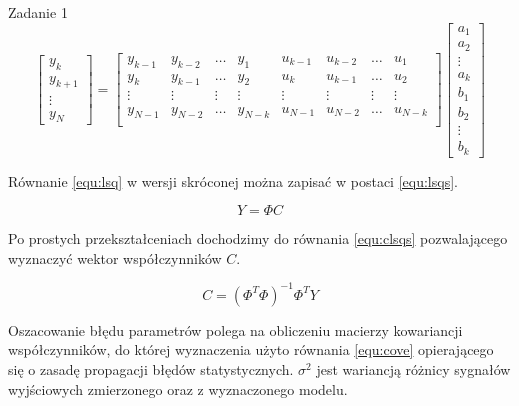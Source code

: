 \documentclass[12pt]{article}
\begin{document}
\begin{section}{Zadanie 1}
    \begin{equation}
      \begin{bmatrix}
        y_k \\ y_{k+1} \\ \vdots \\ y_N
      \end{bmatrix} =
      \begin{bmatrix}
        y_{k-1} & y_{k-2} & \hdots & y_{1} & u_{k-1} & u_{k-2} & \hdots & u_1 \\
        y_{k}   & y_{k-1} & \hdots & y_{2} & u_{k}   & u_{k-1} & \hdots & u_2 \\
        \vdots  & \vdots  & \vdots & \vdots & \vdots & \vdots  &\vdots  & \vdots \\
        y_{N-1} & y_{N-2} & \hdots & y_{N-k} & u_{N-1} & u_{N-2} & \hdots &
        u_{N-k} \\
      \end{bmatrix}
      \begin{bmatrix}
        a_1 \\ a_2 \\ \vdots \\ a_k \\ b_1 \\ b_2 \\ \vdots \\ b_k 
      \end{bmatrix}
      \label{equ:lsq}
    \end{equation}
    \vspace{0.2cm}
    
    \newpage
    
    Równanie \ref{equ:lsq} w wersji skróconej można zapisać w postaci
    \ref{equ:lsqs}.
    
    \begin{equation}
      Y = \Phi C
      \label{equ:lsqs} 
    \end{equation}
    \vspace{0.2cm}
    
    Po prostych przekształceniach dochodzimy do równania \ref{equ:clsqs} pozwalającego
    wyznaczyć wektor współczynników $C$.
    
    \begin{equation}
      C = (\Phi^T\Phi)^{-1}\Phi^T Y
      \label{equ:clsqs} 
    \end{equation}
    \vspace{0.2cm}
    
    Oszacowanie błędu parametrów polega na obliczeniu macierzy kowariancji
    współczynników, do której wyznaczenia użyto równania \ref{equ:cove}
    opierającego się o zasadę propagacji błędów statystycznych.
    $\sigma^2$ jest wariancją różnicy sygnałów wyjściowych zmierzonego oraz z
    wyznaczonego modelu.
    

\end{section}
\end{document}
